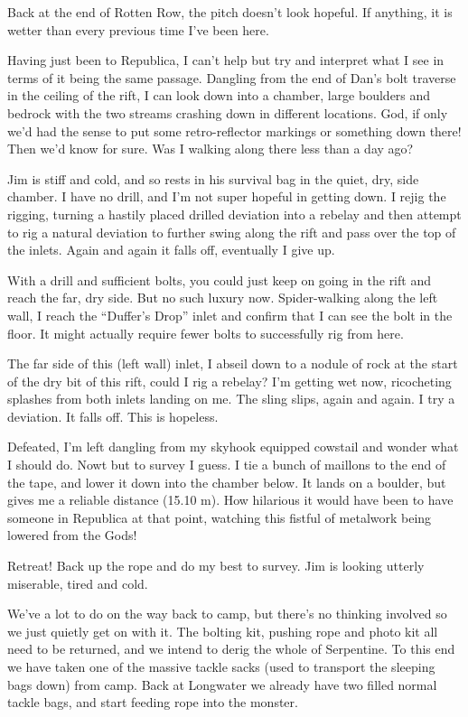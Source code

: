 Back at the end of Rotten Row, the pitch doesn't look hopeful. If
anything, it is wetter than every previous time I've been here.

Having just been to Republica, I can't help but try and interpret what I
see in terms of it being the same passage. Dangling from the end of
Dan's bolt traverse in the ceiling of the rift, I can look down into a
chamber, large boulders and bedrock with the two streams crashing down
in different locations. God, if only we'd had the sense to put some
retro-reflector markings or something down there! Then we'd know for
sure. Was I walking along there less than a day ago?

Jim is stiff and cold, and so rests in his survival bag in the quiet,
dry, side chamber. I have no drill, and I'm not super hopeful in getting
down. I rejig the rigging, turning a hastily placed drilled deviation
into a rebelay and then attempt to rig a natural deviation to further
swing along the rift and pass over the top of the inlets. Again and
again it falls off, eventually I give up.

With a drill and sufficient bolts, you could just keep on going in the
rift and reach the far, dry side. But no such luxury now. Spider-walking
along the left wall, I reach the ``Duffer's Drop'' inlet and confirm
that I can see the bolt in the floor. It might actually require fewer
bolts to successfully rig from here.

The far side of this (left wall) inlet, I abseil down to a nodule of
rock at the start of the dry bit of this rift, could I rig a rebelay?
I'm getting wet now, ricocheting splashes from both inlets landing on
me. The sling slips, again and again. I try a deviation. It falls off.
This is hopeless.

Defeated, I'm left dangling from my skyhook equipped cowstail and wonder
what I should do. Nowt but to survey I guess. I tie a bunch of maillons
to the end of the tape, and lower it down into the chamber below. It
lands on a boulder, but gives me a reliable distance (15.10 m). How
hilarious it would have been to have someone in Republica at that point,
watching this fistful of metalwork being lowered from the Gods!

Retreat! Back up the rope and do my best to survey. Jim is looking
utterly miserable, tired and cold.

We've a lot to do on the way back to camp, but there's no thinking
involved so we just quietly get on with it. The bolting kit, pushing
rope and photo kit all need to be returned, and we intend to derig the
whole of Serpentine. To this end we have taken one of the massive tackle
sacks (used to transport the sleeping bags down) from camp. Back at
Longwater we already have two filled normal tackle bags, and start
feeding rope into the monster.

